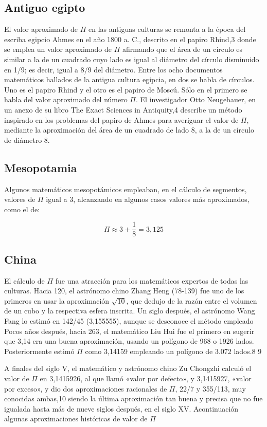 \documentclass[spanish,11pt,a4paper]{article}
\begin{document}
\subsection{Antiguo egipto}

El valor aproximado de $\Pi$ en las antiguas culturas se remonta a la época del escriba egipcio Ahmes en el año 1800 a. C., descrito en el papiro Rhind,3 donde se emplea un valor aproximado de $\Pi$ afirmando que el área de un círculo es similar a la de un cuadrado cuyo lado es igual al diámetro del círculo disminuido en 1/9; es decir, igual a 8/9 del diámetro. 
Entre los ocho documentos matemáticos hallados de la antigua cultura egipcia, en dos se habla de círculos. Uno es el papiro Rhind y el otro es el papiro de Moscú. Sólo en el primero se habla del valor aproximado del número $\Pi$. El investigador Otto Neugebauer, en un anexo de su libro The Exact Sciences in Antiquity,4 describe un método inspirado en los problemas del papiro de Ahmes para averiguar el valor de $\Pi$, mediante la aproximación del área de un cuadrado de lado 8, a la de un círculo de diámetro 8.

\subsection{Mesopotamia}
Algunos matemáticos mesopotámicos empleaban, en el cálculo de segmentos, valores de $\Pi$ igual a 3, alcanzando en algunos casos valores más aproximados, como el de:

    $$\Pi \approx 3 + \frac{1}{8} = 3,125$$ 
\subsection{China} 
El cálculo de $\Pi$ fue una atracción para los matemáticos expertos de todas las culturas. Hacia 120, el astrónomo chino Zhang Heng (78-139) \cite{Wiki} fue uno de los primeros en usar la aproximación $\sqrt{10}$, que dedujo de la razón entre el volumen de un cubo y la respectiva esfera inscrita. Un siglo después, el astrónomo Wang Fang lo estimó en 142/45 (3,155555), aunque se desconoce el método empleado Pocos años después, hacia 263, el matemático Liu Hui fue el primero en sugerir que 3,14 era una buena aproximación, usando un polígono de 968 o 1926 lados. Posteriormente estimó $\Pi$ como 3,14159 empleando un polígono de 3.072 lados.8 9

A finales del siglo V, el matemático y astrónomo chino Zu Chongzhi \cite{Wiki} calculó el valor de $\Pi$ en 3,1415926, al que llamó «valor por defecto», y 3,1415927, «valor por exceso», y dio dos aproximaciones racionales de $\Pi$, 22/7 y 355/113, muy conocidas ambas,10 siendo la última aproximación tan buena y precisa que no fue igualada hasta más de nueve siglos después, en el siglo XV.
Acontinuación algunas aproximaciones históricas de valor de $\Pi$ \cite{Libro1}
\end{document}
